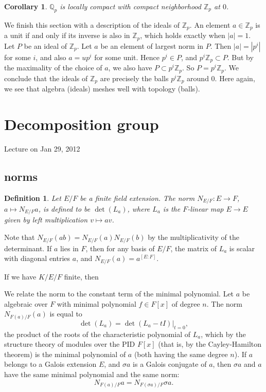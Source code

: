 \documentclass{amsart}
\newcommand{\ring}[1]{\mathbb{#1}}
\newtheorem{definition}[equation]{Definition}
\newtheorem{corollary}[equation]{Corollary}
\def\abs#1{{|#1|}}
\begin{document}
\begin{corollary} $\ring{Q}_p$ is locally compact with compact neighborhood $\ring{Z}_p$
at $0$.
\end{corollary}

We finish this section with a description of the ideals of $\ring{Z}_p$.
An element $a\in\ring{Z}_p$ is a unit if and only if its inverse is also in $\ring{Z}_p$,
which holds exactly when $\abs{a}=1$.   Let $P$ be an ideal of $\ring{Z}_p$.  Let
$a$ be an element of largest norm in $P$.  Then $\abs{a}=\abs{p^i}$ for some $i$, and
also $a = u p^i$ for some unit.  Hence $p^i \in P$, and $p^i\ring{Z}_p\subset P$.  But
by the maximality of the choice of $a$, we also have $P\subset p^i\ring{Z}_p$.  
So $P=p^i\ring{Z}_p$.  We conclude that the ideals of $\ring{Z}_p$ are precisely
the balls $p^i\ring{Z}_p$ around $0$.  Here again, we see that algebra (ideals) meshes
well with topology (balls).

\newpage
\section{Decomposition group}

Lecture on Jan 29, 2012

\subsection{norms}

\begin{definition}
  Let $E/F$ be a finite field extension.  The norm $N_{E/F}:E\to F$,
  $a\mapsto N_{E/F}a$, is defined to be $\det(L_a)$, where $L_a$ is
  the $F$-linear map $E\to E$ given by left multiplication $v\mapsto a
  v$.
\end{definition}

Note that $N_{E/F}(a b) = N_{E/F}(a) N_{E/F}(b)$ by the
multiplicativity of the determinant.  If $a$ lies in $F$, then for any
basis of $E/F$, the matrix of $L_a$
is scalar with diagonal entries $a$, and
$N_{E/F}(a) = a^{[E:F]}$.  

If we have $K/E/F$ finite, then

We relate the norm to the constant term of the minimal polynomial.  
Let $a$ be algebraic over $F$ with minimal polynomial
$f\in F[x]$ of degree $n$.  The norm $N_{F(a)/F}(a)$ is
equal to
\[
\det(L_a) = \det(L_a - t I)|_{t=0},
\]
the product of the roots of the characteristic polynomial of $L_a$,
which by the structure theory of modules over the PID $F[x]$ (that is, by the
Cayley-Hamilton theorem) is the
minimal polynomial of $a$ (both having the same degree $n$).  If $a$
belongs to a Galois extension $E$, and $\sigma a$ is a Galois
conjugate of $a$, then $\sigma a$ and $a$ have the same minimal
polynomial and the same norm:
\[
N_{F(a)/F}a = N_{F(\sigma a)/F}\sigma a.
\]
\end{document}
